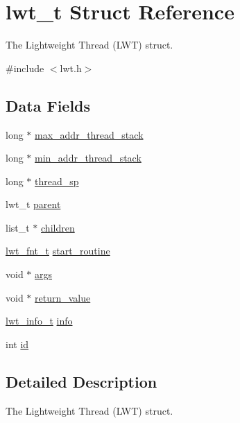 \hypertarget{structlwt}{\section{lwt\+\_\+t Struct Reference}
\label{structlwt}
}


The Lightweight Thread (L\+W\+T) struct.  




{\ttfamily \#include $<$lwt.\+h$>$}

\subsection*{Data Fields}
\begin{DoxyCompactItemize}
\item 
long $\ast$ \hyperlink{structlwt_ae97cdce617ee026378588f57a999f972}{max\+\_\+addr\+\_\+thread\+\_\+stack}
\item 
long $\ast$ \hyperlink{structlwt_a62ea9a882e0a197b9b076e1e018048d7}{min\+\_\+addr\+\_\+thread\+\_\+stack}
\item 
long $\ast$ \hyperlink{structlwt_aba48cdf2f962d7ededf74923ddd33ea1}{thread\+\_\+sp}
\item 
lwt\+\_\+t \hyperlink{structlwt_a1849cde569fc8f254db05365de570b0e}{parent}
\item 
list\+\_\+t $\ast$ \hyperlink{structlwt_aea6931811e4b99f909101d0f6f86cb59}{children}
\item 
\hyperlink{lwt_8h_a58d5112b6c76cbcd033e124f6131a51a}{lwt\+\_\+fnt\+\_\+t} \hyperlink{structlwt_acdcfc344e943154b9d3d11e1a41cb9f1}{start\+\_\+routine}
\item 
void $\ast$ \hyperlink{structlwt_a6e870b21b996bc5c62b6cbd04328e784}{args}
\item 
void $\ast$ \hyperlink{structlwt_a22ac5beef8503481294035218e73c3ef}{return\+\_\+value}
\item 
\hyperlink{lwt_8h_a1148b40d53237025b24f0b603b387e75}{lwt\+\_\+info\+\_\+t} \hyperlink{structlwt_a40641e751624b983f5e1ae5302210e5d}{info}
\item 
int \hyperlink{structlwt_aa3df3d76d606756e38bb9bd3d2c2d241}{id}
\end{DoxyCompactItemize}


\subsection{Detailed Description}
The Lightweight Thread (L\+W\+T) struct. 

